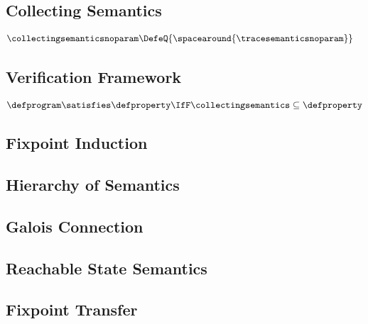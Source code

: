 \subsection{Collecting Semantics}

\begin{definition}
  \begin{align*}
    \collectingsemanticsnoparam &\DefeQ \{\spacearound{\tracesemanticsnoparam}\}
  \end{align*}

\end{definition}

\subsection{Verification Framework}

\begin{definition}[Validation]
  \begin{align*}
    \defprogram \satisfies \defproperty \IfF \collectingsemantics \subseteq \defproperty
  \end{align*}
\end{definition}

\subsection{Fixpoint Induction}

\subsection{Hierarchy of Semantics}

\subsection{Galois Connection}

\subsection{Reachable State Semantics}

\subsection{Fixpoint Transfer}

